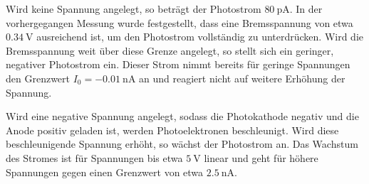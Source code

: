 Wird keine Spannung angelegt, so beträgt der Photostrom $\SI{80}{\pico\ampere}$.
In der vorhergegangen Messung wurde festgestellt, dass eine Bremsspannung von etwa $\SI{0.34}{\volt}$ 
ausreichend ist, um den Photostrom vollständig zu unterdrücken.
Wird die Bremsspannung weit über diese Grenze angelegt, so stellt sich ein geringer, negativer Photostrom ein.
Dieser Strom nimmt bereits für geringe Spannungen den Grenzwert $I_0=\SI{-0.01}{\nano\ampere}$ an und reagiert nicht auf weitere Erhöhung der Spannung.

Wird eine negative Spannung angelegt, sodass die Photokathode negativ und die Anode positiv geladen ist, 
werden Photoelektronen beschleunigt.
Wird diese beschleunigende Spannung erhöht, so wächst der Photostrom an. 
Das Wachstum des Stromes ist für Spannungen bis etwa $\SI{5}{\volt}$ linear und geht für höhere Spannungen gegen einen Grenzwert von etwa $\SI{2.5}{\nano\ampere}$.